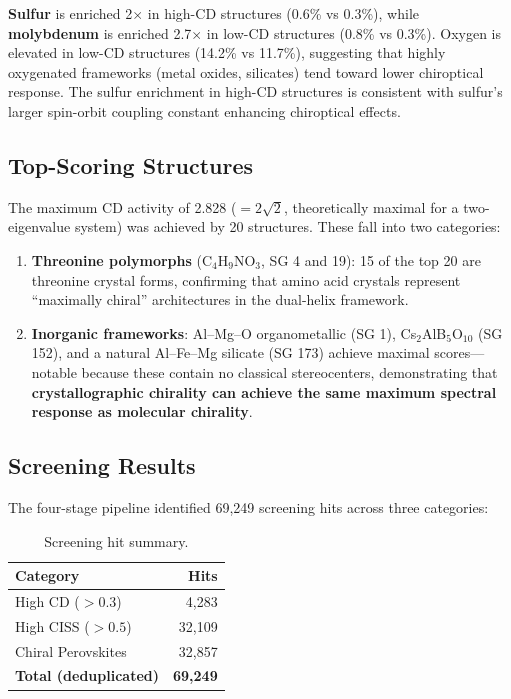 \documentclass[11pt,a4paper]{article}
\begin{document}
\noindent \textbf{Sulfur} is enriched 2$\times$ in high-CD structures (0.6\% vs 0.3\%), while \textbf{molybdenum} is enriched 2.7$\times$ in low-CD structures (0.8\% vs 0.3\%). Oxygen is elevated in low-CD structures (14.2\% vs 11.7\%), suggesting that highly oxygenated frameworks (metal oxides, silicates) tend toward lower chiroptical response. The sulfur enrichment in high-CD structures is consistent with sulfur's larger spin-orbit coupling constant enhancing chiroptical effects.

\subsection{Top-Scoring Structures}

The maximum CD activity of 2.828 ($= 2\sqrt{2}$, theoretically maximal for a two-eigenvalue system) was achieved by 20 structures. These fall into two categories:

\begin{enumerate}[nosep]
\item \textbf{Threonine polymorphs} (C$_4$H$_9$NO$_3$, SG 4 and 19): 15 of the top 20 are threonine crystal forms, confirming that amino acid crystals represent ``maximally chiral'' architectures in the dual-helix framework.
\item \textbf{Inorganic frameworks}: Al--Mg--O organometallic (SG 1), Cs$_2$AlB$_5$O$_{10}$ (SG 152), and a natural Al--Fe--Mg silicate (SG 173) achieve maximal scores---notable because these contain no classical stereocenters, demonstrating that \textbf{crystallographic chirality can achieve the same maximum spectral response as molecular chirality}.
\end{enumerate}

\subsection{Screening Results}

The four-stage pipeline identified 69,249 screening hits across three categories:

\begin{table}[H]
\centering
\caption{Screening hit summary.}
\label{tab:screening}
\begin{tabular}{lr}
\toprule
Category & Hits \\
\midrule
High CD ($>0.3$) & 4,283 \\
High CISS ($>0.5$) & 32,109 \\
Chiral Perovskites & 32,857 \\
\midrule
\textbf{Total (deduplicated)} & \textbf{69,249} \\
\bottomrule
\end{tabular}
\end{table}
\end{document}
